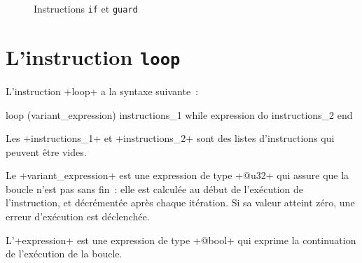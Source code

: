 \begin{figure}[ht]
  \centering
  \hspace{1cm}
  \caption{Instructions \texttt{if} et \texttt{guard}}
\end{figure}













\section{L'instruction \texttt{loop}}


L'instruction \ggsq+loop+ a la syntaxe suivante~:
\begin{galgas4box}
loop (variant_expression)
  instructions_1
while expression do
  instructions_2
end
\end{galgas4box}


Les \ggsq+instructions_1+ et \ggsq+instructions_2+ sont des listes d'instructions qui peuvent être vides.


Le \ggsq+variant_expression+ est une expression de type \ggsq+@u32+ qui assure que la boucle n'est pas sans fin~: elle est calculée au début de l'exécution de l'instruction, et décrémentée après chaque itération. Si sa valeur atteint zéro, une erreur d'exécution est déclenchée.

L'\ggsq+expression+ est une expression de type \ggsq+@bool+ qui exprime la continuation de l'exécution de la boucle.

